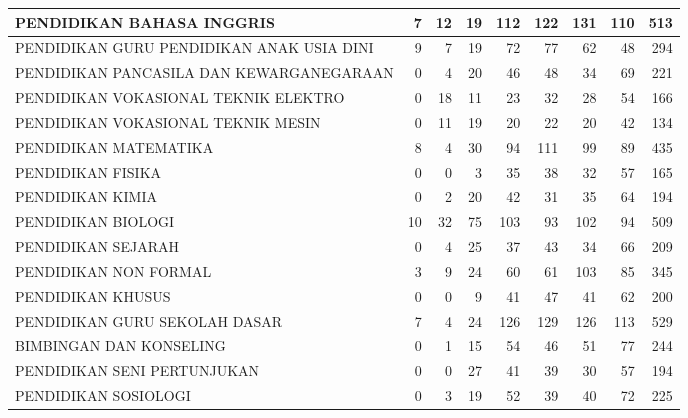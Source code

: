 \documentclass[
]{book}
\begin{document}
\begin{table}[H]
\begin{tabular}{l|r|r|r|r|r|r|r|r}
\hline
\hspace{1em}PENDIDIKAN BAHASA INGGRIS & 7 & 12 & 19 & 112 & 122 & 131 & 110 & 513\\
\hline
\hspace{1em}PENDIDIKAN GURU PENDIDIKAN ANAK USIA DINI & 9 & 7 & 19 & 72 & 77 & 62 & 48 & 294\\
\hline
\hspace{1em}PENDIDIKAN PANCASILA DAN KEWARGANEGARAAN & 0 & 4 & 20 & 46 & 48 & 34 & 69 & 221\\
\hline
\hspace{1em}PENDIDIKAN VOKASIONAL TEKNIK ELEKTRO & 0 & 18 & 11 & 23 & 32 & 28 & 54 & 166\\
\hline
\hspace{1em}PENDIDIKAN VOKASIONAL TEKNIK MESIN & 0 & 11 & 19 & 20 & 22 & 20 & 42 & 134\\
\hline
\hspace{1em}PENDIDIKAN MATEMATIKA & 8 & 4 & 30 & 94 & 111 & 99 & 89 & 435\\
\hline
\hspace{1em}PENDIDIKAN FISIKA & 0 & 0 & 3 & 35 & 38 & 32 & 57 & 165\\
\hline
\hspace{1em}PENDIDIKAN KIMIA & 0 & 2 & 20 & 42 & 31 & 35 & 64 & 194\\
\hline
\hspace{1em}PENDIDIKAN BIOLOGI & 10 & 32 & 75 & 103 & 93 & 102 & 94 & 509\\
\hline
\hspace{1em}PENDIDIKAN SEJARAH & 0 & 4 & 25 & 37 & 43 & 34 & 66 & 209\\
\hline
\hspace{1em}PENDIDIKAN NON FORMAL & 3 & 9 & 24 & 60 & 61 & 103 & 85 & 345\\
\hline
\hspace{1em}PENDIDIKAN KHUSUS & 0 & 0 & 9 & 41 & 47 & 41 & 62 & 200\\
\hline
\hspace{1em}PENDIDIKAN GURU SEKOLAH DASAR & 7 & 4 & 24 & 126 & 129 & 126 & 113 & 529\\
\hline
\hspace{1em}BIMBINGAN DAN KONSELING & 0 & 1 & 15 & 54 & 46 & 51 & 77 & 244\\
\hline
\hspace{1em}PENDIDIKAN SENI PERTUNJUKAN & 0 & 0 & 27 & 41 & 39 & 30 & 57 & 194\\
\hline
\hspace{1em}PENDIDIKAN SOSIOLOGI & 0 & 3 & 19 & 52 & 39 & 40 & 72 & 225\\

\end{tabular}
\end{table}
\end{document}
